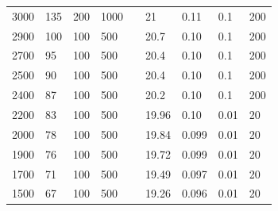 \documentclass{article}
\begin{document}
\begin{longtable}[c]{|l|l|l|l|l|l|l|l|l|}
    3000          & 135                       & 200                       & 1000                       &  & 21         & 0.11                       & 0.1                        & 200                        \\ \cline{1-4} \cline{6-9}
    2900          & 100                       & 100                       & 500                        &  & 20.7       & 0.10                       & 0.1                        & 200                        \\ \cline{1-4} \cline{6-9}
    2700          & 95                        & 100                       & 500                        &  & 20.4       & 0.10                       & 0.1                        & 200                        \\ \cline{1-4} \cline{6-9}
    2500          & 90                        & 100                       & 500                        &  & 20.4       & 0.10                       & 0.1                        & 200                        \\ \cline{1-4} \cline{6-9}
    2400          & 87                        & 100                       & 500                        &  & 20.2       & 0.10                       & 0.1                        & 200                        \\ \cline{1-4} \cline{6-9}
    2200          & 83                        & 100                       & 500                        &  & 19.96      & 0.10                       & 0.01                       & 20                         \\ \cline{1-4} \cline{6-9}
    2000          & 78                        & 100                       & 500                        &  & 19.84      & 0.099                      & 0.01                       & 20                         \\ \cline{1-4} \cline{6-9}
    1900          & 76                        & 100                       & 500                        &  & 19.72      & 0.099                      & 0.01                       & 20                         \\ \cline{1-4} \cline{6-9}
    1700          & 71                        & 100                       & 500                        &  & 19.49      & 0.097                      & 0.01                       & 20                         \\ \cline{1-4} \cline{6-9}
    1500          & 67                        & 100                       & 500                        &  & 19.26      & 0.096                      & 0.01                       & 20                         \\ \cline{1-4} \cline{6-9}

\end{longtable}
\end{document}

